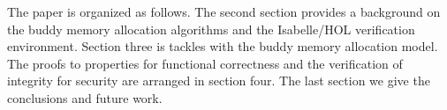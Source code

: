 The paper is organized as follows. The second section provides a background on the buddy memory allocation algorithms and the Isabelle/HOL verification environment. Section three is tackles with the buddy memory allocation model. The proofs to properties for functional correctness and the verification of integrity for security are arranged in section four. The last section we give the conclusions and future work.
